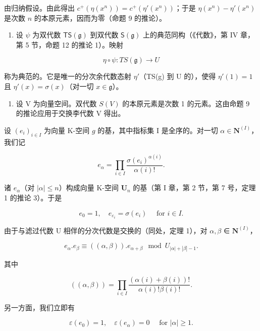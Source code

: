 由归纳假设。由此得出 \(c^{+}(\eta(x^{n})) = c^{+}(\eta'(x^{n}))\)；于是 \(\eta(x^{n}) - \eta'(x^{n})\) 是次数 \(n\) 的本原元素，因而为零（命题 9 的推论）。

\begin{enumerate}
\def\labelenumi{(\arabic{enumi})}
\setcounter{enumi}{2}
\tightlist
\item
  设 \(\psi\) 为双代数 \(\mathsf{TS}(\mathfrak{g})\) 到双代数 \(\mathsf{S}(\mathfrak{g})\) 上的典范同构（《代数》，第 IV 章，第 5 节，命题 12 的推论 1）。映射
\end{enumerate}

\[
\eta \circ \psi : T S (\mathfrak {g}) \rightarrow U
\]

称为典范的。它是唯一的分次余代数态射 \(\eta'\)（TS(g) 到 U 的），使得 \(\eta'(1) = 1\) 且 \(\eta'(x) = \sigma(x)\)（对一切 \(x \in \mathfrak{g}\)）。

\begin{enumerate}
\def\labelenumi{(\arabic{enumi})}
\setcounter{enumi}{3}
\tightlist
\item
  设 V 为向量空间。双代数 \(S(V)\) 的本原元素是次数 1 的元素。这由命题 9 的推论应用于交换李代数 V 得出。
\end{enumerate}

设 \((e_i)_{i\in I}\) 为向量 K-空间 \(g\) 的基，其中指标集 I 是全序的。对一切 \(\alpha \in \mathbf{N}^{(I)}\)，我们记

\[
e _ {\alpha} = \prod_ {i \in I} \frac {\sigma (e _ {i}) ^ {\alpha (i)}}{\alpha (i) !}.\tag{13}
\]

诸 \(e_{\alpha}\)（对 \(|\alpha| \leqslant n\)）构成向量 K-空间 \(\mathbf{U}_n\) 的基（第 I 章，第 2 节，第 7 号，定理 1 的推论 3）。于是

\[
e _ {0} = 1, \quad e _ {\varepsilon_ {i}} = \sigma (e _ {i}) \quad \text { for } i \in I.
\]

由于与滤过代数 U 相伴的分次代数是交换的（同处，定理 1），对 \(\alpha, \beta\) ∈ \(\mathbf{N}^{(I)}\)，

\[
e _ {\alpha}. e _ {\beta} \equiv ((\alpha , \beta)). e _ {\alpha + \beta} \mod U _ {| \alpha | + | \beta | - 1}.\tag{14}
\]

其中

\[
((\alpha , \beta)) = \prod_ {i \in I} \frac {(\alpha (i) + \beta (i)) !}{\alpha (i) ! \beta (i) !}.
\]

另一方面，我们立即有

\[
\varepsilon (e _ {0}) = 1, \quad \varepsilon (e _ {\alpha}) = 0 \quad \text { for } | \alpha | \geqslant 1.\tag{15}
\]

